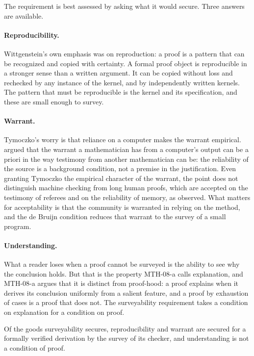 \documentclass{situationist-preprint}
\begin{document}
The requirement is best assessed by asking what it would secure. Three answers are available.

\paragraph{Reproducibility.} Wittgenstein's own emphasis was on reproduction: a proof is a pattern that can be recognized and copied with certainty. A formal proof object is reproducible in a stronger sense than a written argument. It can be copied without loss and rechecked by any instance of the kernel, and by independently written kernels. The pattern that must be reproducible is the kernel and its specification, and these are small enough to survey.

\paragraph{Warrant.} Tymoczko's worry is that reliance on a computer makes the warrant empirical. \citet{Burge1998} argued that the warrant a mathematician has from a computer's output can be a priori in the way testimony from another mathematician can be: the reliability of the source is a background condition, not a premise in the justification. Even granting Tymoczko the empirical character of the warrant, the point does not distinguish machine checking from long human proofs, which are accepted on the testimony of referees and on the reliability of memory, as \citet{DetlefsenLuker1980} observed. What matters for acceptability is that the community is warranted in relying on the method, and the de Bruijn condition reduces that warrant to the survey of a small program.

\paragraph{Understanding.} What a reader loses when a proof cannot be surveyed is the ability to see why the conclusion holds. But that is the property MTH-08-a calls explanation, and MTH-08-a argues that it is distinct from proof-hood: a proof explains when it derives its conclusion uniformly from a salient feature, and a proof by exhaustion of cases is a proof that does not. The surveyability requirement takes a condition on explanation for a condition on proof.

\begin{proposition}\label{p:sep}
Of the goods surveyability secures, reproducibility and warrant are secured for a formally verified derivation by the survey of its checker, and understanding is not a condition of proof.
\end{proposition}
\end{document}
